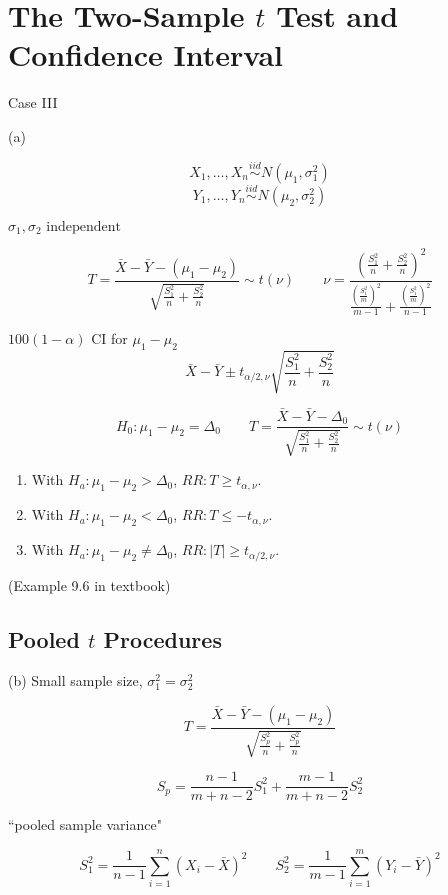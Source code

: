 \section{The Two-Sample $t$ Test and Confidence Interval}
Case III

(a) 

\[X_1,\dots,X_n \overset{iid}{\sim} N(\mu_1,\sigma_1^2)\]
\[Y_1,\dots,Y_n \overset{iid}{\sim} N(\mu_2,\sigma_2^2)\] 

$\sigma_1,\sigma_2 \text{ independent} $

\[T=\frac{\bar{X}-\bar{Y}-(\mu_1-\mu_2)}{\sqrt{\frac{S_1^2}{n}+\frac{S_2^2}{n}}} \sim t(\nu) \qquad \nu=\frac{\left( \frac{S_1^2}{n}+\frac{S_2^2}{n} \right)^2}{ \frac{\left( \frac{S_1^2}{m} \right)^2}{m-1}+ \frac{\left( \frac{S_1^2}{m} \right)^2}{n-1}  } \]

$100(1-\alpha)$ CI for $\mu_1-\mu_2$
\[\bar{X}-\bar{Y} \pm t_{\alpha/2,\nu} \sqrt{\frac{S_1^2}{n}+\frac{S_2^2}{n}}  \]

\[H_0:\mu_1-\mu_2=\Delta_0 \qquad T=\frac{\bar{X}-\bar{Y}-\Delta_0}{\sqrt{\frac{S_1^2}{n}+\frac{S_2^2}{n}}} \sim t(\nu)\]
\begin{enumerate}
\item With $H_a: \mu_1-\mu_2>\Delta_0$, $RR:T\geq t_{\alpha,\nu}$.
\item With $H_a: \mu_1-\mu_2<\Delta_0$, $RR:T\leq -t_{\alpha,\nu}$.
\item With $H_a: \mu_1-\mu_2\neq\Delta_0$, $RR:|T|\geq t_{\alpha/2,\nu}$.
\end{enumerate}

\begin{exmp}
(Example 9.6 in textbook)
\end{exmp}

\subsection{Pooled $t$ Procedures}
(b) Small sample size, $\sigma_1^2=\sigma_2^2$

\[T=\frac{\bar{X}-\bar{Y}-(\mu_1-\mu_2)}{\sqrt{\frac{S_p^2}{n}+\frac{S_p^2}{n}}}\]

\[S_p=\frac{n-1}{m+n-2}S_1^2+\frac{m-1}{m+n-2}S_2^2\]

``pooled sample variance"

\[S_1^2=\frac{1}{n-1} \sum_{i=1}^n (X_i-\bar{X})^2 \qquad S_2^2=\frac{1}{m-1} \sum_{i=1}^m (Y_i-\bar{Y})^2 \]

